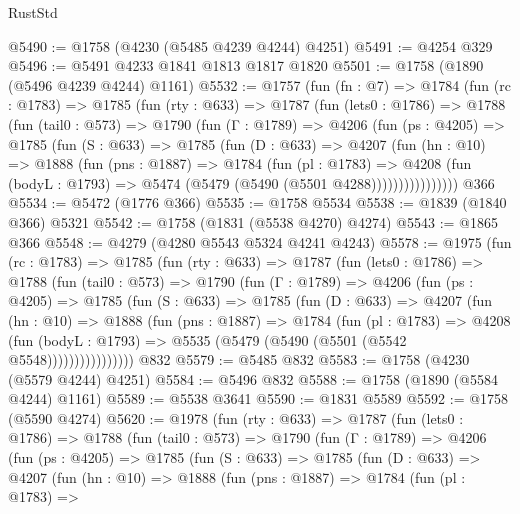 \begin{lexlean}{RustStd}
\begin{coremodule}
@5490 := @1758 (@4230 (@5485 @4239 @4244) @4251)
@5491 := @4254 @329
@5496 := @5491 @4233 @1841 @1813 @1817 @1820
@5501 := @1758 (@1890 (@5496 @4239 @4244) @1161)
@5532 := @1757
    (fun (fn : @7) =>
    @1784
      (fun (rc : @1783) =>
      @1785
        (fun (rty : @633) =>
        @1787
          (fun (lets0 : @1786) =>
          @1788
            (fun (tail0 : @573) =>
            @1790
              (fun (Γ : @1789) =>
              @4206
                (fun (ps : @4205) =>
                @1785
                  (fun (S : @633) =>
                  @1785
                    (fun (D : @633) =>
                    @4207
                      (fun (hn : @10) =>
                      @1888
                        (fun (pns : @1887) =>
                        @1784
                          (fun (pl : @1783) =>
                          @4208
                            (fun (bodyL : @1793) => @5474 (@5479 (@5490 (@5501 @4288))))))))))))))))
    @366
@5534 := @5472 (@1776 @366)
@5535 := @1758 @5534
@5538 := @1839 (@1840 @366) @5321
@5542 := @1758 (@1831 (@5538 @4270) @4274)
@5543 := @1865 @366
@5548 := @4279 (@4280 @5543 @5324 @4241 @4243)
@5578 := @1975
    (fun (rc : @1783) =>
    @1785
      (fun (rty : @633) =>
      @1787
        (fun (lets0 : @1786) =>
        @1788
          (fun (tail0 : @573) =>
          @1790
            (fun (Γ : @1789) =>
            @4206
              (fun (ps : @4205) =>
              @1785
                (fun (S : @633) =>
                @1785
                  (fun (D : @633) =>
                  @4207
                    (fun (hn : @10) =>
                    @1888
                      (fun (pns : @1887) =>
                      @1784
                        (fun (pl : @1783) =>
                        @4208
                          (fun (bodyL : @1793) =>
                          @5535 (@5479 (@5490 (@5501 (@5542 @5548))))))))))))))))
    @832
@5579 := @5485 @832
@5583 := @1758 (@4230 (@5579 @4244) @4251)
@5584 := @5496 @832
@5588 := @1758 (@1890 (@5584 @4244) @1161)
@5589 := @5538 @3641
@5590 := @1831 @5589
@5592 := @1758 (@5590 @4274)
@5620 := @1978
    (fun (rty : @633) =>
    @1787
      (fun (lets0 : @1786) =>
      @1788
        (fun (tail0 : @573) =>
        @1790
          (fun (Γ : @1789) =>
          @4206
            (fun (ps : @4205) =>
            @1785
              (fun (S : @633) =>
              @1785
                (fun (D : @633) =>
                @4207
                  (fun (hn : @10) =>
                  @1888
                    (fun (pns : @1887) =>
                    @1784
                      (fun (pl : @1783) =>

\end{coremodule}
\end{lexlean}
